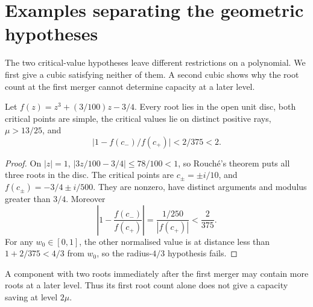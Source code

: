 \documentclass[11pt]{article}
\begin{document}
\section{Examples separating the geometric hypotheses}\label{sec:component-examples}

The two critical-value hypotheses leave different restrictions on a
polynomial. We first give a cubic satisfying neither of them. A second
cubic shows why the root count at the first merger cannot determine
capacity at a later level.

\begin{proposition}
\label{res:sep-or-false}
Let $f(z)=z^3+(3/100)z-3/4$.  Every root lies in the open unit disc, both
critical points are simple, the critical values lie on distinct positive
rays, $\mu>13/25$, and
\[
 \bigl|1-f(c_-)/f(c_+)\bigr|<2/375<2.
\]
\end{proposition}
\begin{proof}
On $|z|=1$, $|3z/100-3/4|\le78/100<1$, so Rouch\'e's theorem puts
all three roots in the disc. The critical points are $c_\pm=\pm i/10$,
and $f(c_\pm)=-3/4\pm i/500$. They are nonzero, have distinct arguments
and modulus greater than $3/4$. Moreover
\[
 \left|1-\frac{f(c_-)}{f(c_+)}\right|
 =\frac{1/250}{|f(c_+)|}<\frac2{375}.
\]
For any $w_0\in[0,1]$, the other normalised value is at distance less
than $1+2/375<4/3$ from $w_0$, so the radius-$4/3$ hypothesis fails.
\end{proof}

A component with two roots immediately after the first merger may
contain more roots at a later level. Thus its first root count alone
does not give a capacity saving at level $2\mu$.
\end{document}
